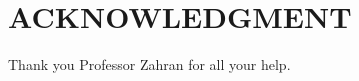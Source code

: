 \documentclass[letterpaper, 10 pt, conference]{ieeeconf}  %
\begin{document}

\addtolength{\textheight}{-12cm}   %









\section*{ACKNOWLEDGMENT}

Thank you Professor Zahran for all your help.
\end{document}
